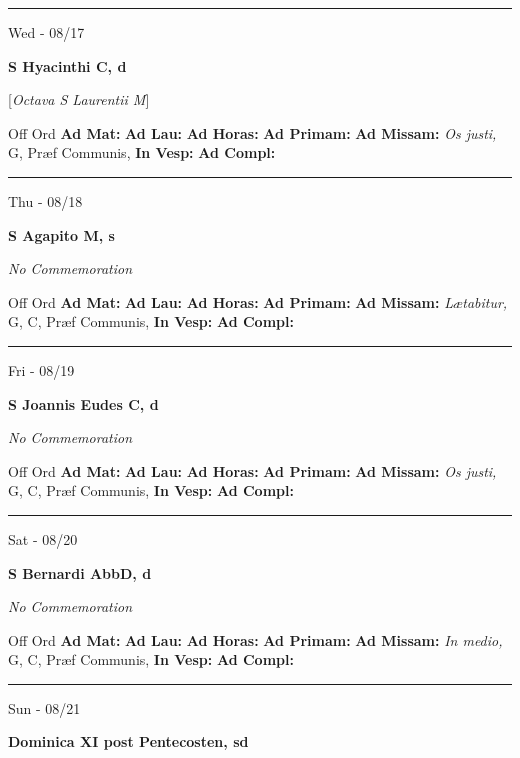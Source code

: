 \documentclass[letterpaper, 10pt]{article}
\begin{document}
\hrule
\begin{center}
Wed - 08/17
\end{center}\textbf{ \large S Hyacinthi C, \textnormal{\normalsize d}}

[\textit{Octava S Laurentii M}]
\begin{justify}
Off Ord
\textbf{Ad Mat: }
\textbf{Ad Lau: }
\textbf{Ad Horas: }
\textbf{Ad Primam: }
\textbf{Ad Missam:} \textit{Os justi, } G, Præf Communis, 
\textbf{In Vesp: }
\textbf{Ad Compl: }\end{justify}



\hrule
\begin{center}
Thu - 08/18
\end{center}\textbf{ \large S Agapito M, \textnormal{\normalsize s}}

\textit{No Commemoration}\begin{justify}
Off Ord
\textbf{Ad Mat: }
\textbf{Ad Lau: }
\textbf{Ad Horas: }
\textbf{Ad Primam: }
\textbf{Ad Missam:} \textit{Lætabitur, } G, C, Præf Communis, 
\textbf{In Vesp: }
\textbf{Ad Compl: }\end{justify}



\hrule
\begin{center}
Fri - 08/19
\end{center}\textbf{ \large S Joannis Eudes C, \textnormal{\normalsize d}}

\textit{No Commemoration}\begin{justify}
Off Ord
\textbf{Ad Mat: }
\textbf{Ad Lau: }
\textbf{Ad Horas: }
\textbf{Ad Primam: }
\textbf{Ad Missam:} \textit{Os justi, } G, C, Præf Communis, 
\textbf{In Vesp: }
\textbf{Ad Compl: }\end{justify}



\hrule
\begin{center}
Sat - 08/20
\end{center}\textbf{ \large S Bernardi AbbD, \textnormal{\normalsize d}}

\textit{No Commemoration}\begin{justify}
Off Ord
\textbf{Ad Mat: }
\textbf{Ad Lau: }
\textbf{Ad Horas: }
\textbf{Ad Primam: }
\textbf{Ad Missam:} \textit{In medio, } G, C, Præf Communis, 
\textbf{In Vesp: }
\textbf{Ad Compl: }\end{justify}



\hrule
\begin{center}
Sun - 08/21
\end{center}\textbf{ \large Dominica XI post Pentecosten, \textnormal{\normalsize sd}}
\end{document}
